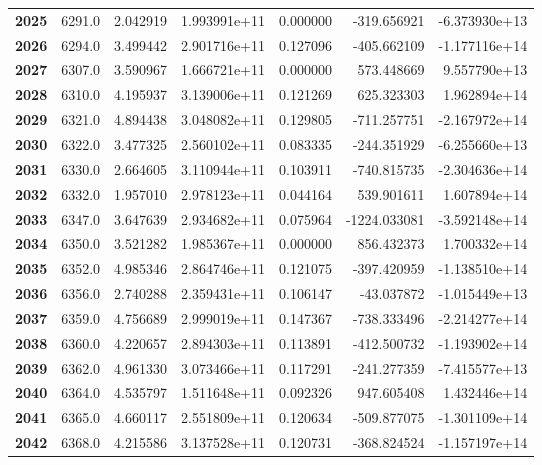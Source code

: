 \documentclass{report}[12pt]
\begin{document}
\begin{center}
\begin{tabular}{lrrrrrr}
\textbf{2025} &         6291.0 &   2.042919 &  1.993991e+11 &    0.000000 &  -319.656921 & -6.373930e+13 \\
\textbf{2026} &         6294.0 &   3.499442 &  2.901716e+11 &    0.127096 &  -405.662109 & -1.177116e+14 \\
\textbf{2027} &         6307.0 &   3.590967 &  1.666721e+11 &    0.000000 &   573.448669 &  9.557790e+13 \\
\textbf{2028} &         6310.0 &   4.195937 &  3.139006e+11 &    0.121269 &   625.323303 &  1.962894e+14 \\
\textbf{2029} &         6321.0 &   4.894438 &  3.048082e+11 &    0.129805 &  -711.257751 & -2.167972e+14 \\
\textbf{2030} &         6322.0 &   3.477325 &  2.560102e+11 &    0.083335 &  -244.351929 & -6.255660e+13 \\
\textbf{2031} &         6330.0 &   2.664605 &  3.110944e+11 &    0.103911 &  -740.815735 & -2.304636e+14 \\
\textbf{2032} &         6332.0 &   1.957010 &  2.978123e+11 &    0.044164 &   539.901611 &  1.607894e+14 \\
\textbf{2033} &         6347.0 &   3.647639 &  2.934682e+11 &    0.075964 & -1224.033081 & -3.592148e+14 \\
\textbf{2034} &         6350.0 &   3.521282 &  1.985367e+11 &    0.000000 &   856.432373 &  1.700332e+14 \\
\textbf{2035} &         6352.0 &   4.985346 &  2.864746e+11 &    0.121075 &  -397.420959 & -1.138510e+14 \\
\textbf{2036} &         6356.0 &   2.740288 &  2.359431e+11 &    0.106147 &   -43.037872 & -1.015449e+13 \\
\textbf{2037} &         6359.0 &   4.756689 &  2.999019e+11 &    0.147367 &  -738.333496 & -2.214277e+14 \\
\textbf{2038} &         6360.0 &   4.220657 &  2.894303e+11 &    0.113891 &  -412.500732 & -1.193902e+14 \\
\textbf{2039} &         6362.0 &   4.961330 &  3.073466e+11 &    0.117291 &  -241.277359 & -7.415577e+13 \\
\textbf{2040} &         6364.0 &   4.535797 &  1.511648e+11 &    0.092326 &   947.605408 &  1.432446e+14 \\
\textbf{2041} &         6365.0 &   4.660117 &  2.551809e+11 &    0.120634 &  -509.877075 & -1.301109e+14 \\
\textbf{2042} &         6368.0 &   4.215586 &  3.137528e+11 &    0.120731 &  -368.824524 & -1.157197e+14 \\

\end{tabular}
\end{center}
\end{document}
